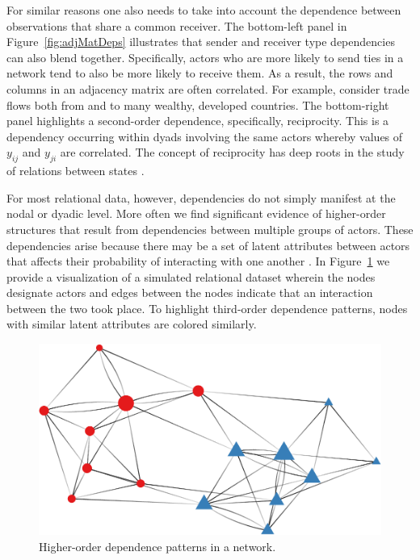For similar reasons one also needs to take into account the dependence between observations that share a common receiver. The bottom-left panel in Figure~\ref{fig:adjMatDeps} illustrates that sender and receiver type dependencies can also blend together. Specifically, actors who are more likely to send ties in a network tend to also be more likely to receive them. As a result, the rows and columns in an adjacency matrix are often correlated. For example, consider trade flows both from and to many wealthy, developed countries. The bottom-right panel highlights a second-order dependence, specifically, reciprocity. This is a dependency occurring within dyads involving the same actors whereby values of $y_{ij}$ and $y_{ji}$ are correlated. The concept of reciprocity has deep roots in the study of relations between states \citep{richardson:1960,keohane:1989}.

For most relational data, however, dependencies do not simply manifest at the nodal or dyadic level. More often we find significant evidence of higher-order structures that result from dependencies between multiple groups of actors. These dependencies arise because there may be a set of latent attributes between actors that affects their probability of interacting with one another \citep{zinnes:1967,wasserman:faust:1994}. In Figure~\ref{fig:thirdDeps} we provide a visualization of a simulated relational dataset wherein the nodes designate actors and edges between the nodes indicate that an interaction between the two took place. To highlight third-order dependence patterns, nodes with similar latent attributes are colored similarly.

\begin{figure}[ht]
	\includegraphics[width=.6\textwidth]{graphics/stochEquiv_v2.pdf}
	\caption{Higher-order dependence patterns in a network.}
	\label{fig:thirdDeps}
\end{figure}

